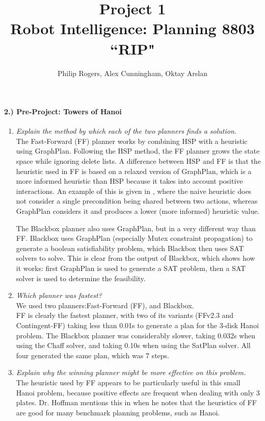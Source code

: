 \documentclass{article}
\begin{document}
\title{Project 1\\{\large{Robot Intelligence: Planning 8803 \textbf{``RIP"}}}}
\author{Philip Rogers, Alex Cunningham, Oktay Arslan}
\maketitle

\paragraph{2.) Pre-Project: Towers of Hanoi}
\begin{enumerate}
\item{\textit{Explain the method by which each of the two planners finds a solution.\\}}
The Fast-Forward (FF) planner works by combining HSP with a heuristic using GraphPlan. Following the HSP method, the FF planner grows the state space while ignoring delete lists.  A difference between HSP and FF is that the heuristic used in FF is based on a relaxed version of GraphPlan, which is a more informed heuristic than HSP because it takes into account positive interactions.  An example of this is given in \cite{hoffmann2001fast}, where the naive heuristic does not consider a single precondition being shared between two actions, whereas GraphPlan considers it and produces a lower (more informed) heuristic value.


The Blackbox planner also uses GraphPlan, but in a very different way than FF.  Blackbox uses GraphPlan (especially Mutex constraint propagation) to generate a boolean satisfiability problem, which Blackbox then uses SAT solvers to solve.  This is clear from the output of Blackbox, which shows how it works: first GraphPlan is used to generate a SAT problem, then a SAT solver is used to determine the feasibility.

\item{\textit{Which planner was fastest?\\}}
We used two planners:Fast-Forward (FF), and Blackbox.\\
FF is clearly the fastest planner, with two of its variants (FFv2.3 and Contingent-FF) taking less than 0.01s to generate a plan for the 3-disk Hanoi problem.  The Blackbox planner was considerably slower, taking 0.032s when using the Chaff solver, and taking 0.10s when using the SatPlan solver.  All four generated the same plan, which was 7 steps.

\item{\textit{Explain why the winning planner might be more effective on this problem.\\}}
The heuristic used by FF appears to be particularly useful in this small Hanoi problem, because positive effects are frequent when dealing with only 3 plates.  Dr. Hoffman mentions this in \cite{hoffmann2001fast} when he notes that the heuristics of FF are good for many benchmark planning problems, such as Hanoi.  
\end{enumerate}
\end{document}
